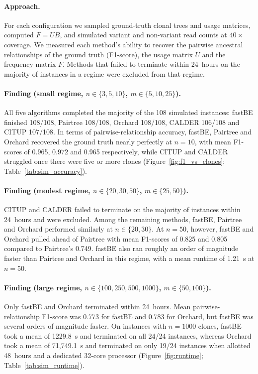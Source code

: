\documentclass[11pt]{article}
\begin{document}
\paragraph{Approach.}
For each configuration we sampled ground-truth clonal trees and usage matrices, computed $F = UB$, and simulated variant and non-variant read counts at $40\times$ coverage. We measured each method's ability to recover the pairwise ancestral relationships of the ground truth (F1-score), the usage matrix $U$ and the frequency matrix $F$. Methods that failed to terminate within 24~hours on the majority of instances in a regime were excluded from that regime.

\paragraph{Finding (small regime, $n\in\{3,5,10\}$, $m\in\{5,10,25\}$).}
All five algorithms completed the majority of the 108 simulated instances: fastBE finished 108/108, Pairtree 108/108, Orchard 108/108, CALDER 106/108 and CITUP 107/108. In terms of pairwise-relationship accuracy, fastBE, Pairtree and Orchard recovered the ground truth nearly perfectly at $n=10$, with mean F1-scores of 0.965, 0.972 and 0.965 respectively, while CITUP and CALDER struggled once there were five or more clones (Figure~\ref{fig:f1_vs_clones}; Table~\ref{tab:sim_accuracy}).

\paragraph{Finding (modest regime, $n\in\{20,30,50\}$, $m\in\{25,50\}$).}
CITUP and CALDER failed to terminate on the majority of instances within 24~hours and were excluded. Among the remaining methods, fastBE, Pairtree and Orchard performed similarly at $n\in\{20,30\}$. At $n=50$, however, fastBE and Orchard pulled ahead of Pairtree with mean F1-scores of 0.825 and 0.805 compared to Pairtree's 0.749. fastBE also ran roughly an order of magnitude faster than Pairtree and Orchard in this regime, with a mean runtime of 1.21~s at $n=50$.

\paragraph{Finding (large regime, $n\in\{100,250,500,1000\}$, $m\in\{50,100\}$).}
Only fastBE and Orchard terminated within 24~hours. Mean pairwise-relationship F1-score was 0.773 for fastBE and 0.783 for Orchard, but fastBE was several orders of magnitude faster. On instances with $n=1000$ clones, fastBE took a mean of 1229.8~s and terminated on all 24/24 instances, whereas Orchard took a mean of 71{,}749.1~s and terminated on only 19/24 instances when allotted 48~hours and a dedicated 32-core processor (Figure~\ref{fig:runtime}; Table~\ref{tab:sim_runtime}).
\end{document}
